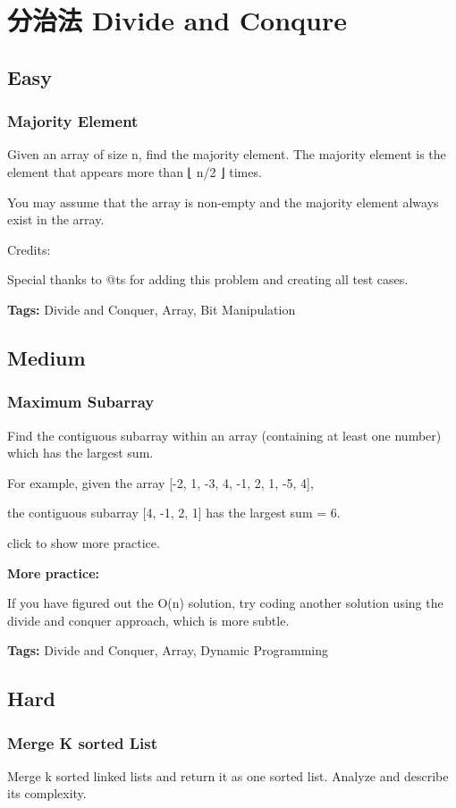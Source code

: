 \documentclass[12pt]{book}
\begin{document}
\chapter{分治法 Divide and Conqure}
\label{sec-12}
\section{Easy}
\label{sec-12-1}
\subsection{Majority Element}
\label{sec-12-1-1}
Given an array of size n, find the majority element. The majority element is the element that appears more than ⌊ n/2 ⌋ times.

You may assume that the array is non-empty and the majority element always exist in the array.

Credits:

Special thanks to @ts for adding this problem and creating all test cases.

\textbf{Tags:} Divide and Conquer, Array, Bit Manipulation

\section{Medium}
\label{sec-12-2}
\subsection{Maximum Subarray}
\label{sec-12-2-1}
Find the contiguous subarray within an array (containing at least one number) which has the largest sum.

For example, given the array [-2, 1, -3, 4, -1, 2, 1, -5, 4], 

the contiguous subarray [4, -1, 2, 1] has the largest sum = 6.

click to show more practice.

\textbf{More practice:}

If you have figured out the O(n) solution, try coding another solution using the divide and conquer approach, which is more subtle.

\textbf{Tags:} Divide and Conquer, Array, Dynamic Programming

\section{Hard}
\label{sec-12-3}
\subsection{Merge K sorted List}
\label{sec-12-3-1}
Merge k sorted linked lists and return it as one sorted list. Analyze and describe its complexity.
\end{document}

